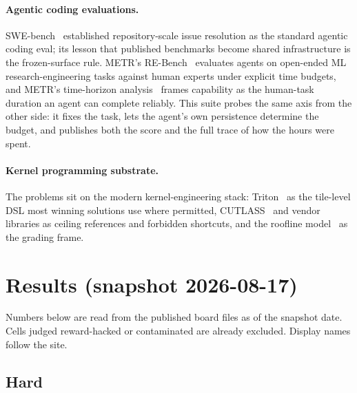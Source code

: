 \documentclass[11pt]{article}
\begin{document}
\paragraph{Agentic coding evaluations.} SWE-bench~\citep{jimenez2024swebench} established repository-scale issue resolution as the standard agentic coding eval; its lesson that published benchmarks become shared infrastructure is the frozen-surface rule. METR's RE-Bench~\citep{wijk2024rebench} evaluates agents on open-ended ML research-engineering tasks against human experts under explicit time budgets, and METR's time-horizon analysis~\citep{kwa2025longtasks} frames capability as the human-task duration an agent can complete reliably. This suite probes the same axis from the other side: it fixes the task, lets the agent's own persistence determine the budget, and publishes both the score and the full trace of how the hours were spent.

\paragraph{Kernel programming substrate.} The problems sit on the modern kernel-engineering stack: Triton~\citep{tillet2019triton} as the tile-level DSL most winning solutions use where permitted, CUTLASS~\citep{nvidia2017cutlass} and vendor libraries as ceiling references and forbidden shortcuts, and the roofline model~\citep{williams2009roofline} as the grading frame.

\section{Results (snapshot 2026-08-17)}
\label{sec:results}

Numbers below are read from the published board files as of the snapshot date. Cells judged reward-hacked or contaminated are already excluded. Display names follow the site.

\subsection{Hard}
\end{document}
